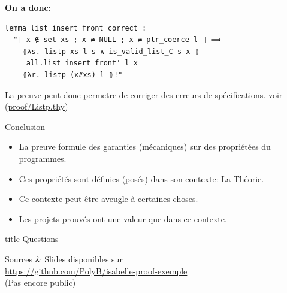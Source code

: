 \documentclass[hyperref={pdfpagelabels=false}]{beamer}
\begin{document}
\begin{frame}[fragile]
\textbf{On a donc}:
  \begin{center}
    \begin{minipage}{0.8\textwidth}
      \begin{lstlisting}
lemma list_insert_front_correct :
  "⟦ x ∉ set xs ; x ≠ NULL ; x ≠ ptr_coerce l ⟧ ⟹
    ⦃λs. listp xs l s ∧ is_valid_list_C s x ⦄
     all.list_insert_front' l x
    ⦃λr. listp (x#xs) l ⦄!"
       \end{lstlisting}
    \end{minipage}
  \end{center}
  La preuve peut donc permetre de corriger des erreurs de spécifications.
  \vfill
  \hfill
  {\tiny voir (\url{proof/Listp.thy})}
\end{frame}


\begin{frame}{Conclusion}
  \begin{itemize}
    \item La preuve formule des garanties (mécaniques) sur des propriétées du programmes.
    \item Ces propriétés sont définies (posés) dans son contexte: La Théorie.
    \item Ce contexte peut être aveugle à certaines choses.
    \item Les projets prouvés ont une valeur que dans ce contexte.
  \end{itemize}
\end{frame}

\begin{frame}[fragile]
  \vfill
  \centering
  \begin{beamercolorbox}[sep=8pt,center,shadow=true,rounded=true]{title}
    Questions\par%
  \end{beamercolorbox}
  \begin{center}
  Sources \& Slides disponibles sur \\
    {\small \url{https://github.com/PolyB/isabelle-proof-exemple}}\\
    {\tiny (Pas encore public)}
  \end{center}
\end{frame}
\end{document}
